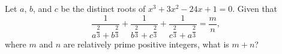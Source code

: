 Let $a$, $b$, and $c$ be the distinct roots of $x^3+3x^2-24x+1=0$. Given that \[\dfrac{1}{a^{\dfrac{2}{3}} + b^{\dfrac{2}{3}}} + \dfrac{1}{b^{\dfrac{2}{3}} + c^{\dfrac{2}{3}}} + \dfrac{1}{c^{\dfrac{2}{3}} + a^{\dfrac{2}{3}}} = \dfrac{m}{n} ,\]where $m$ and $n$ are relatively prime positive integers, what is $m+n$?
